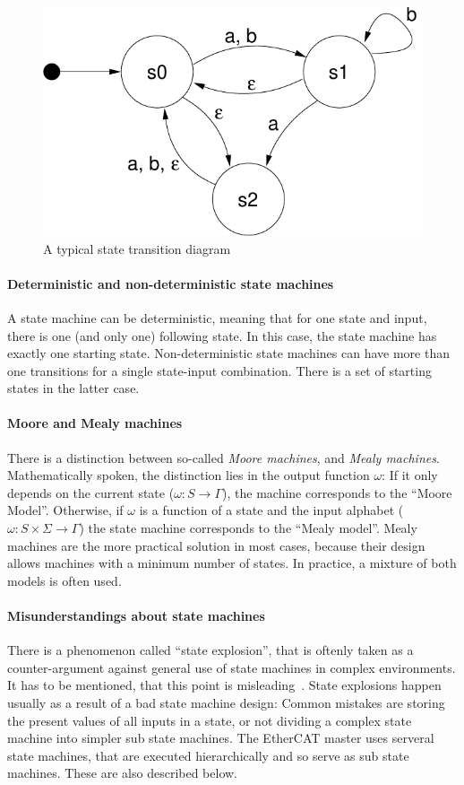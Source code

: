 \documentclass[a4paper,12pt,BCOR6mm,bibtotoc,idxtotoc]{scrbook}
\begin{document}
\begin{figure}[htbp]
  \centering
  \includegraphics[width=.5\textwidth]{images/statetrans}
  \caption{A typical state transition diagram}
  \label{fig:statetrans}
\end{figure}

\paragraph{Deterministic and non-deterministic state machines}

A state machine can be deterministic, meaning that for one state and
input, there is one (and only one) following state. In this case, the
state machine has exactly one starting state. Non-deterministic state
machines can have more than one transitions for a single state-input
combination. There is a set of starting states in the latter case.

\paragraph{Moore and Mealy machines}

There is a distinction between so-called \textit{Moore machines}, and
\textit{Mealy machines}. Mathematically spoken, the distinction lies
in the output function $\omega$: If it only depends on the current
state ($\omega: S \rightarrow \Gamma$), the machine corresponds to the
``Moore Model''. Otherwise, if $\omega$ is a function of a state and
the input alphabet ($\omega: S \times \Sigma \rightarrow \Gamma$) the
state machine corresponds to the ``Mealy model''. Mealy machines are
the more practical solution in most cases, because their design allows
machines with a minimum number of states. In practice, a mixture of
both models is often used.

\paragraph{Misunderstandings about state machines}

There is a phenomenon called ``state explosion'', that is oftenly
taken as a counter-argument against general use of state machines in
complex environments. It has to be mentioned, that this point is
misleading~\cite{fsmmis}. State explosions happen usually as a result
of a bad state machine design: Common mistakes are storing the present
values of all inputs in a state, or not dividing a complex state
machine into simpler sub state machines. The EtherCAT master uses
serveral state machines, that are executed hierarchically and so serve
as sub state machines. These are also described below.
\end{document}
